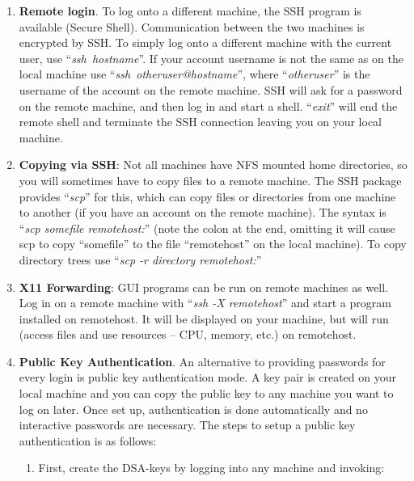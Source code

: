 \documentclass[
]{article}
\begin{document}
\begin{enumerate}
\def\labelenumi{\alph{enumi}.}
\item
  \textbf{Remote login}. To log onto a different machine, the SSH
  program is available (Secure Shell). Communication between the two
  machines is encrypted by SSH. To simply log onto a different machine
  with the current user, use ``\emph{ssh~hostname}''. If your account
  username is not the same as on the local machine use
  ``\emph{ssh~otheruser@hostname}'', where ``\emph{otheruser}'' is the
  username of the account on the remote machine. SSH will ask for a
  password on the remote machine, and then log in and start a shell.
  ``\emph{exit}'' will end the remote shell and terminate the SSH
  connection leaving you on your local machine.
\item
  \textbf{Copying via SSH}: Not all machines have NFS mounted home
  directories, so you will sometimes have to copy files to a remote
  machine. The SSH package provides ``\emph{scp}'' for this, which can
  copy files or directories from one machine to another (if you have an
  account on the remote machine). The syntax is ``\emph{scp somefile
  remotehost:}'' (note the colon at the end, omitting it will cause scp
  to copy ``somefile'' to the file ``remotehost'' on the local machine).
  To copy directory trees use ``\emph{scp -r directory remotehost:}''
\item
  \textbf{X11 Forwarding}: GUI programs can be run on remote machines as
  well. Log in on a remote machine with ``\emph{ssh -X remotehost}'' and
  start a program installed on remotehost. It will be displayed on your
  machine, but will run (access files and use resources -- CPU, memory,
  etc.) on remotehost.
\item
  \textbf{Public Key Authentication}. An alternative to providing
  passwords for every login is public key authentication mode. A key
  pair is created on your local machine and you can copy the public key
  to any machine you want to log on later. Once set up, authentication
  is done automatically and no interactive passwords are necessary. The
  steps to setup a public key authentication is as follows:

  \begin{enumerate}
  \def\labelenumii{\roman{enumii}.}
  \item
    First, create the DSA-keys by logging into any machine and invoking:
  \end{enumerate}
\end{enumerate}
\end{document}
